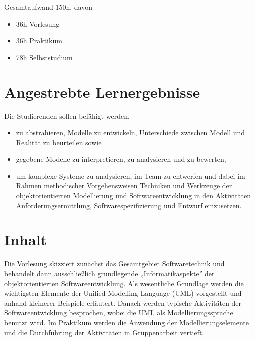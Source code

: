 Gesamtaufwand 150h, davon

\begin{itemize}
\tightlist
\item
  36h Vorlesung
\item
  36h Praktikum
\item
  78h Selbststudium
\end{itemize}

\hypertarget{angestrebte-lernergebnissepathlabelmi-2017modulbeschreibungen-bachelorba_softwaretechnik}{%
\section*{Angestrebte
Lernergebnisse\label{/mi-2017/modulbeschreibungen-bachelor/BA_Softwaretechnik}}\label{angestrebte-lernergebnissepathlabelmi-2017modulbeschreibungen-bachelorba_softwaretechnik}}

Die Studierenden sollen befähigt werden,

\begin{itemize}
\tightlist
\item
  zu abstrahieren, Modelle zu entwickeln, Unterschiede zwischen Modell
  und Realität zu beurteilen sowie
\item
  gegebene Modelle zu interpretieren, zu analysieren und zu bewerten,
\item
  um komplexe Systeme zu analysieren, im Team zu entwerfen und dabei im
  Rahmen methodischer Vorgehensweisen Techniken und Werkzeuge der
  objektorientierten Modellierung und Softwareentwicklung in den
  Aktivitäten Anforderungsermittlung, Softwarespezifizierung und Entwurf
  einzusetzen.
\end{itemize}

\hypertarget{inhaltpathlabelmi-2017modulbeschreibungen-bachelorba_softwaretechnik}{%
\section*{Inhalt\label{/mi-2017/modulbeschreibungen-bachelor/BA_Softwaretechnik}}\label{inhaltpathlabelmi-2017modulbeschreibungen-bachelorba_softwaretechnik}}

Die Vorlesung skizziert zunächst das Gesamtgebiet Softwaretechnik und
behandelt dann ausschließlich grundlegende „Informatikaspekte'' der
objektorientierten Softwareentwicklung. Als wesentliche Grundlage werden
die wichtigsten Elemente der Unified Modelling Language (UML)
vorgestellt und anhand kleinerer Beispiele erläutert. Danach werden
typische Aktivitäten der Softwareentwicklung besprochen, wobei die UML
als Modellierungssprache benutzt wird. Im Praktikum werden die Anwendung
der Modellierungselemente und die Durchführung der Aktivitäten in
Gruppenarbeit vertieft.

